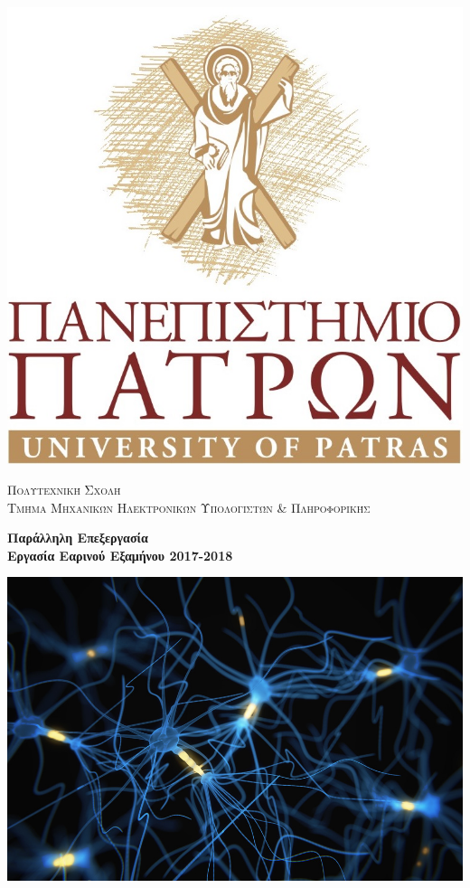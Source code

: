 \documentclass[a4paper,oneside,titlepage,10pt]{article}
\begin{document}
\begin{center}
    \thispagestyle{empty}
    \includegraphics[scale=0.9]{logo.jpg}
    
    \vspace{0.5cm}
    
    \textsc{\large Πολυτεχνική Σχολή \\ Τμήμα Μηχανικών Ηλεκτρονικών Υπολογιστών \& Πληροφορικής}
    
    \vspace{0.75cm}
    
    {\huge \noindent\textbf{Παράλληλη Επεξεργασία}
    \vspace{0.1cm}
\\ {\Large \textbf{Εργασία Εαρινού Εξαμήνου 2017-2018}}}

\vspace{1cm}
    
    \includegraphics[scale=0.4]{neur.jpg}
    

\end{center}
\end{document}
